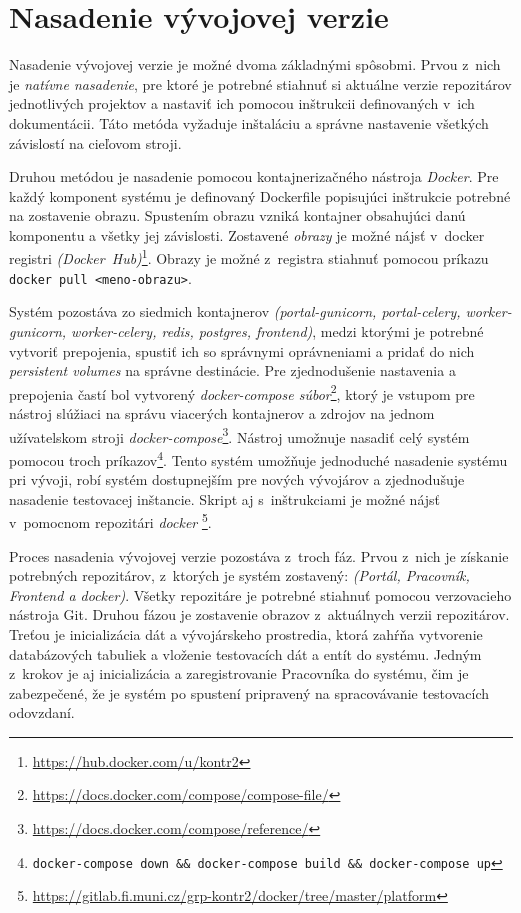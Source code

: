 \documentclass[
  digital, %
  oneside, %
  table,   %
  lof,     %
  lot,   %
]{fithesis3}
\begin{document}
\section{Nasadenie vývojovej verzie}

Nasadenie vývojovej verzie je možné dvoma základnými spôsobmi. Prvou z~nich je \emph{natívne nasadenie}, pre ktoré je potrebné stiahnuť si aktuálne verzie repozitárov jednotlivých projektov a nastaviť ich pomocou inštrukcii definovaných v~ich dokumentácii. Táto metóda vyžaduje inštaláciu a správne nastavenie všetkých závislostí na cieľovom stroji.

Druhou metódou je nasadenie pomocou kontajnerizačného nástroja \emph{Docker}. Pre každý komponent systému je definovaný Dockerfile popisujúci inštrukcie potrebné na zostavenie obrazu. Spustením obrazu vzniká kontajner obsahujúci danú komponentu a všetky jej závislosti. Zostavené \emph{obrazy} je možné nájsť v~docker registri \emph{(Docker~Hub)}\footnote{\url{https://hub.docker.com/u/kontr2}}. Obrazy je možné z~registra stiahnuť pomocou príkazu \texttt{docker pull <meno-obrazu>}.

Systém pozostáva zo siedmich kontajnerov \emph{(portal-gunicorn, portal-celery, worker-gunicorn, worker-celery, redis, postgres, frontend)}, medzi ktorými je potrebné vytvoriť prepojenia, spustiť ich so správnymi oprávneniami a pridať do nich \emph{persistent volumes} na správne destinácie. Pre zjednodušenie nastavenia a prepojenia častí bol vytvorený \emph{docker-compose súbor}\footnote{\url{https://docs.docker.com/compose/compose-file/}}, ktorý je vstupom pre nástroj slúžiaci na správu viacerých kontajnerov a zdrojov na jednom užívatelskom stroji \emph{docker-compose}\footnote{\url{https://docs.docker.com/compose/reference/}}. Nástroj umožnuje nasadiť celý systém pomocou troch príkazov\footnote{\texttt{docker-compose down \&\& docker-compose build \&\& docker-compose up}}. Tento systém umožňuje jednoduché nasadenie systému pri vývoji, robí systém dostupnejším pre nových vývojárov a zjednodušuje nasadenie testovacej inštancie. Skript aj s~inštrukciami je možné nájsť v~pomocnom repozitári \emph{docker} \footnote{\url{https://gitlab.fi.muni.cz/grp-kontr2/docker/tree/master/platform}}.

Proces nasadenia vývojovej verzie pozostáva z~troch fáz. Prvou z~nich je získanie potrebných repozitárov, z~ktorých je systém zostavený: \emph{(Portál, Pracovník, Frontend a docker)}. Všetky repozitáre je potrebné stiahnuť pomocou verzovacieho nástroja Git. Druhou fázou je zostavenie obrazov z~aktuálnych verzii repozitárov. Treťou je inicializácia dát a vývojárskeho prostredia, ktorá zahŕňa vytvorenie databázových tabuliek a vloženie testovacích dát a entít do systému. Jedným z~krokov je aj inicializácia a zaregistrovanie Pracovníka do systému, čim je zabezpečené, že je systém po spustení pripravený na spracovávanie testovacích odovzdaní.
\end{document}
